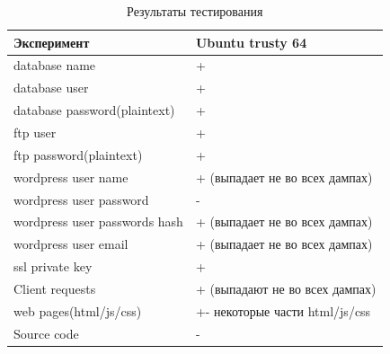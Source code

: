 \documentclass[20pt]{article}
\begin{document}
\begin{table}[]
\centering
\caption{Результаты тестирования}
\label{my-label}
\begin{tabular}{|l|l|}
\hline
Эксперимент                                                                                     & Ubuntu trusty 64               \\  \hline
database name                                                                                   & +                              \\  \hline
database user                                                                                   & +                              \\  \hline
database password(plaintext)                                                                    & +                              \\  \hline
ftp user                                                                                        & +                              \\  \hline
ftp password(plaintext)                                                                         & +                              \\  \hline
wordpress user name                                                                             & + (выпадает не во всех дампах) \\  \hline
wordpress user password                                                                         & -                              \\  \hline
wordpress user passwords hash                                                                   & + (выпадает не во всех дампах) \\  \hline
wordpress user email                                                                            & + (выпадает не во всех дампах) \\  \hline
ssl private key                                                                                 & +                              \\  \hline
Client requests                                                                                 & + (выпадают не во всех дампах) \\  \hline
web pages(html/js/css)                                                                          & +- некоторые части html/js/css \\  \hline
Source code                                                                                     & -                              \\  \hline

\end{tabular}
\end{table}
\end{document}
